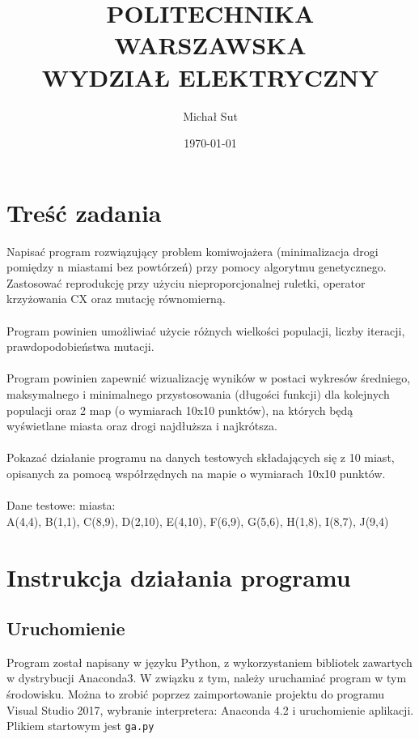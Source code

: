 \documentclass[a4paper,11pt]{article}
\title{POLITECHNIKA WARSZAWSKA \\ WYDZIAŁ ELEKTRYCZNY \\}
\author{Michał Sut}
\date{\today}
\begin{document}
	\thispagestyle{empty}
	\maketitle
	\date{}
	\section{Treść zadania}
		Napisać program rozwiązujący problem komiwojażera (minimalizacja drogi pomiędzy n miastami bez powtórzeń) przy pomocy algorytmu genetycznego. Zastosować reprodukcję przy użyciu nieproporcjonalnej ruletki, operator krzyżowania CX oraz mutację równomierną.\\~\\
		Program powinien umożliwiać użycie różnych wielkości populacji, liczby iteracji, prawdopodobieństwa mutacji.
		\\~\\
		Program powinien zapewnić wizualizację wyników w postaci wykresów średniego, maksymalnego i minimalnego przystosowania (długości funkcji) dla kolejnych populacji oraz 2 map (o wymiarach 10x10 punktów), na których będą wyświetlane miasta oraz drogi najdłuższa i najkrótsza.
		\\~\\
		Pokazać działanie programu na danych testowych składających się z 10 miast, opisanych za pomocą współrzędnych na mapie o wymiarach 10x10 punktów.
		\\~\\
		Dane testowe: miasta:\\
		A(4,4), B(1,1), C(8,9), D(2,10), E(4,10), F(6,9), G(5,6), H(1,8), I(8,7), J(9,4)
	\section{Instrukcja działania programu}
		\subsection{Uruchomienie}
			Program został napisany w języku Python, z wykorzystaniem bibliotek zawartych w dystrybucji Anaconda3. W związku z tym, należy uruchamiać program w tym środowisku. Można to zrobić poprzez zaimportowanie projektu do programu Visual Studio 2017, wybranie interpretera: Anaconda 4.2 i uruchomienie aplikacji. Plikiem startowym jest \texttt{ga.py}
\end{document}
